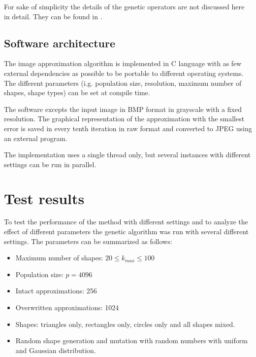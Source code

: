 \documentclass[conference]{IEEEtran}
\begin{document}
For sake of simplicity the details of the genetic operators are not discussed here in detail.
They can be found in \cite{vakulya2021}.

\subsection{Software architecture}

The image approximation algorithm is implemented in C language with as few external
dependencies as possible to be portable to different operating systems. The different
parameters (i.g. population size, resolution, maximum number of shapes, shape types) can
be set at compile time.

The software excepts the input image in BMP format in grayscale with a fixed resolution.
The graphical representation of the approximation with the smallest error is saved
in every tenth iteration in raw format and converted to JPEG using an external program.

The implementation uses a single thread only, but several instances with different settings can
be run in parallel.

\section{Test results}

To test the performance of the method with different settings and to analyze the
effect of different parameters the genetic algorithm was run with several different
settings. The parameters can be summarized as follows:

\begin{itemize}

  \item{Maximum number of shapes: $20 \leq k_{max} \leq 100$}

  \item{Population size: $p=4096$}

  \item{Intact approximations: 256}

  \item{Overwritten approximations: 1024}

  \item{Shapes: triangles only, rectangles only, circles only and all shapes mixed.}

  \item{Random shape generation and mutation with random numbers with uniform and Gaussian distribution.}

\end{itemize}
\end{document}

